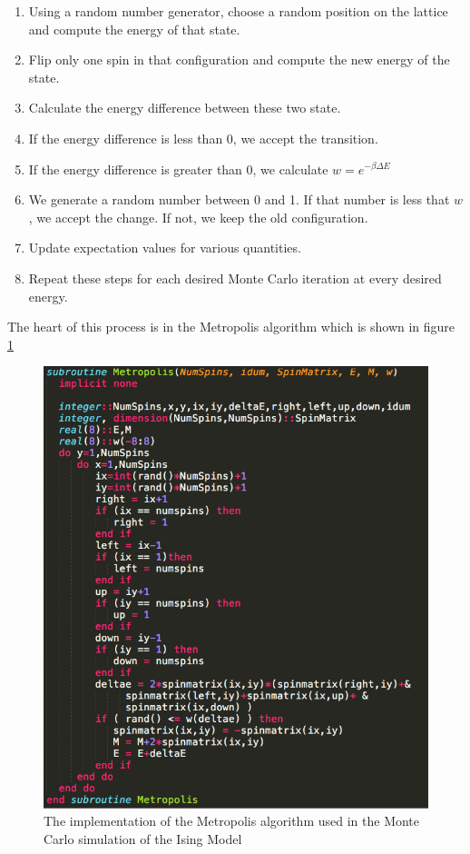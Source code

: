 \documentclass[%
oneside,                 %
final,                   %
10pt]{article}
\begin{document}
\begin{enumerate}
\item Using a random number generator, choose a random position on the lattice and compute the energy of that state.
\item Flip only one spin in that configuration and compute the new energy of the state.
\item Calculate the energy difference between these two state.
\item If the energy difference is less than 0, we accept the transition.
\item If the energy difference is greater than 0, we calculate $w=e^{-\beta \Delta E}$
\item We generate a random number between 0 and 1.  If that number is less that $w$, we accept the change.  If not, we keep the old configuration.
\item Update expectation values for various quantities.
\item Repeat these steps for each desired Monte Carlo iteration at every desired energy.
\end{enumerate}

The heart of this process is in the Metropolis algorithm which is shown in figure \ref{fig:metropolis}

\begin{figure}\label{fig:metropolis}
  \centering
    \includegraphics[width=1.0 \textwidth]{Metropolis}
    \caption{The implementation of the Metropolis algorithm used in the Monte Carlo simulation of the Ising Model}
\end{figure}
\end{document}

